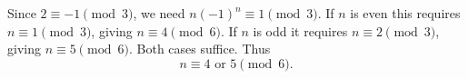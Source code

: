 Since $2\equiv-1\pmod3$, we need $n(-1)^n\equiv1\pmod3$. If $n$ is even this requires $n\equiv1\pmod3$, giving $n\equiv4\pmod6$. If $n$ is odd it requires $n\equiv2\pmod3$, giving $n\equiv5\pmod6$. Both cases suffice. Thus
\[
\boxed{n\equiv4\text{ or }5\pmod6}.
\]
